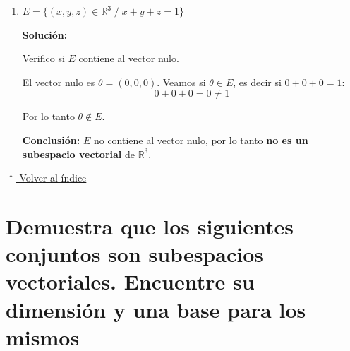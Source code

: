 \documentclass[12pt]{article}
\newcommand{\solucion}{%
    \vspace{0.8em}%
    \textbf{Solución:}%
    \vspace{0.8em}%
}
\newcommand{\volverindice}{%
    \vspace{1em}%
    \begin{flushright}%
        \hyperlink{indice}{\small $\uparrow$ Volver al índice}%
    \end{flushright}%
}
\begin{document}
\begin{enumerate}[label=\alph*.-]
    \[
    P+Q = (x,x^2)+(x_1,x_1^2) = (x+x_1,\; x^2+x_1^2)
    \]

    Verificamos si $P+Q \in D$, es decir si $x^2+x_1^2=(x+x_1)^2$:
    \[
    (x+x_1)^2 = x^2+2xx_1+x_1^2 \neq x^2+x_1^2 \quad \text{(en general, si } x,x_1\neq 0\text{)}
    \]

    Por ejemplo, con $x=1,\, x_1=1$: $P=(1,1),\; Q=(1,1)$, entonces $P+Q=(2,2)$, pero $2\neq 2^2=4$, por lo tanto $P+Q \notin D$.

    \textbf{Conclusión:} $D$ no es cerrado bajo la suma, por lo tanto \textbf{no es un subespacio vectorial} de $\mathbb{R}^2$.

    \item $E = \{(x,y,z) \in \mathbb{R}^3 \; / \; x+y+z=1\}$

    \solucion

    Verifico si $E$ contiene al vector nulo.

    El vector nulo es $\theta=(0,0,0)$. Veamos si $\theta \in E$, es decir si $0+0+0=1$:
    \[
    0+0+0 = 0 \neq 1
    \]

    Por lo tanto $\theta \notin E$.

    \textbf{Conclusión:} $E$ no contiene al vector nulo, por lo tanto \textbf{no es un subespacio vectorial} de $\mathbb{R}^3$.

\end{enumerate}

\volverindice
\newpage

\section{Demuestra que los siguientes conjuntos son subespacios vectoriales. Encuentre su dimensión y una base para los mismos}
\end{document}
